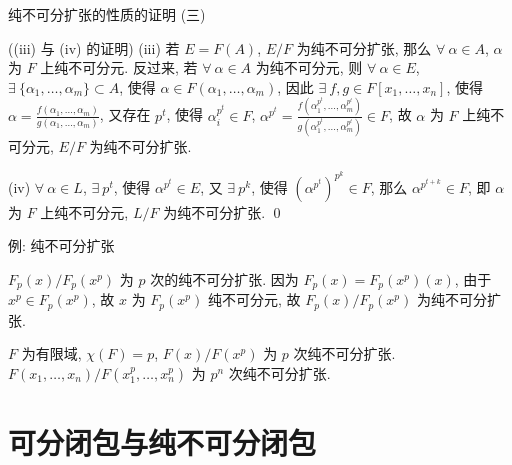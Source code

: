 \begin{frame}{纯不可分扩张的性质的证明 (三)}

\startproof[bg=yellow, fg=red]((iii) 与 (iv) 的证明)
(iii) 若 $E = F(A)$, $E/F$ 为纯不可分扩张, 那么 $\forall\ \alpha \in A$,
$\alpha$ 为 $F$ 上纯不可分元.
反过来, 若 $\forall\ \alpha \in A$ 为纯不可分元, 则 $\forall\ \alpha \in E$,
$\exists\ \{ \alpha_1, \dots, \alpha_m \} \subset A$,
使得 $\alpha \in F(\alpha_1, \dots, \alpha_m)$, 因此 $\exists\ f, g \in F[x_1, \dots, x_n]$,
使得 $\alpha = \frac{f(\alpha_1, \dots, \alpha_m)}{g(\alpha_1, \dots, \alpha_m)}$,
又存在 $p^t$, 使得 $\alpha_i^{p^t} \in F$,
$\alpha^{p^t} = \frac{f(\alpha_1^{p^t}, \dots, \alpha_m^{p^t})}{g(\alpha_1^{p^t}, \dots, \alpha_m^{p^t})} \in F$,
故 $\alpha$ 为 $F$ 上纯不可分元, $E/F$ 为纯不可分扩张.

(iv) $\forall\ \alpha \in L$, $\exists\ p^t$, 使得 $\alpha^{p^t} \in E$,
又 $\exists\ p^k$, 使得 $(\alpha^{p^t})^{p^k} \in F$,
那么 $\alpha^{p^{t+k}} \in F$, 即 $\alpha$ 为 $F$ 上纯不可分元,
$L/F$ 为纯不可分扩张.
\qed

\end{frame}


\begin{frame}{例: 纯不可分扩张}

\begin{eg}
$F_p(x)/F_p(x^p)$ 为 $p$ 次的纯不可分扩张.
因为 $F_p(x) = F_p(x^p)(x)$, 由于 $x^p \in F_p(x^p)$,
故 $x$ 为 $F_p(x^p)$ 纯不可分元, 故 $F_p(x)/F_p(x^p)$ 为纯不可分扩张.
\end{eg}

\begin{eg}
$F$ 为有限域, $\chi(F) = p$, $F(x)/F(x^p)$ 为 $p$ 次纯不可分扩张.
$F(x_1, \dots, x_n)/F(x_1^p, \dots, x_n^p)$ 为 $p^n$ 次纯不可分扩张.
\end{eg}

\end{frame}


\section[闭包]{可分闭包与纯不可分闭包}


